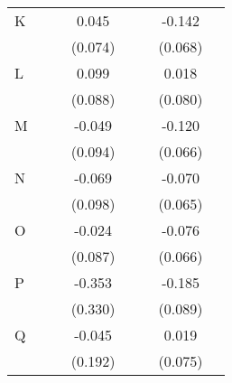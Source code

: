 {\begin{longtable}{l*{3}{c}|l*{3}{c}}
		K                   &                     &                     &       0.045         &                     &                     &      -0.142\sym{*}  \\
		&                     &                     &     (0.074)         &                     &                     &     (0.068)         \\
		L                   &                     &                     &       0.099         &                     &                     &       0.018         \\
		&                     &                     &     (0.088)         &                     &                     &     (0.080)         \\
		M                   &                     &                     &      -0.049         &                     &                     &      -0.120         \\
		&                     &                     &     (0.094)         &                     &                     &     (0.066)         \\
		N                   &                     &                     &      -0.069         &                     &                     &      -0.070         \\
		&                     &                     &     (0.098)         &                     &                     &     (0.065)         \\
		O                   &                     &                     &      -0.024         &                     &                     &      -0.076         \\
		&                     &                     &     (0.087)         &                     &                     &     (0.066)         \\
		P                   &                     &                     &      -0.353         &                     &                     &      -0.185\sym{*}  \\
		&                     &                     &     (0.330)         &                     &                     &     (0.089)         \\
		Q                   &                     &                     &      -0.045         &                     &                     &       0.019         \\
		&                     &                     &     (0.192)         &                     &                     &     (0.075)         \\

\end{longtable}}
